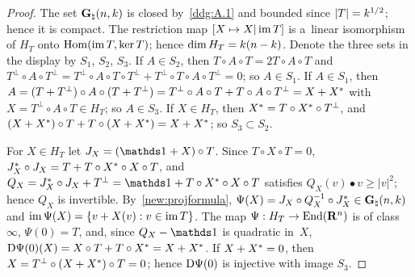\documentclass[a4paper,twoside,leqno]{article}
\newcommand{\Gk}{\pgrass{\adim}{\vdim}}        %
\begin{document}
\begin{proof}
    The set $\Gk$ is closed by~\ref{ddg:A.1} and bounded since $|T| = k^{1/2}$; hence it is
    compact. The restriction map $[ X \mapsto X | \operatorname{im} T ]$ is a~linear isomorphism of $H_T$ onto
    $\operatorname{Hom}(\operatorname{im} T, \ker T)$; hence $\dim H_T = k(n - k)$. Denote the three sets in the
    display by $S_1$, $S_2$, $S_3$. If $A \in S_2$, then $T \circ A \circ T = 2 T \circ A \circ
    T$ and $T^\perp \circ A \circ T^\perp = T^\perp \circ A \circ T \circ T^\perp + T^\perp \circ
    T \circ A \circ T^\perp = 0$; so $A \in S_1$. If $A \in S_1$, then $A = (T + T^\perp) \circ A
    \circ (T + T^\perp) = T^\perp \circ A \circ T + T \circ A \circ T^\perp = X + X^{*}$
    with $X = T^\perp \circ A \circ T \in H_T$; so $A \in S_3$. If $X \in H_T$, then $X^{*}
    = T \circ X^{*} \circ T^\perp$, and $(X + X^{*}) \circ T + T \circ (X +
    X^{*}) = X + X^{*}$; so $S_3 \subset S_2$.

    For $X \in H_T$ let $J_X = (\id{} + X) \circ T$. Since $T \circ X \circ T = 0$,
    $J_X^{*} \circ J_X = T + T \circ X^{*} \circ X \circ T$, and $Q_X =
    \transpose{J_X} \circ J_X + T^\perp = \id{} + T \circ \transpose{X} \circ X \circ T$ satisfies
    $Q_X(v) \bullet v \ge |v|^2$; hence $Q_X$ is invertible. By~\ref{new:projformula}, $\Psi(X) =
    J_X \circ Q_X^{-1} \circ \transpose{J_X} \in \Gk$ and $\operatorname{im} \Psi(X) = \{ v + X(v) : v \in \operatorname{im} T
    \}$. The map $\Psi : H_T \to \mathrm{End}({\mathbf{R}^{n}})$ is of class~$\infty$, $\Psi(0) = T$, and, since
    $Q_X - \id{}$ is quadratic in~$X$, $\mathrm{D} \Psi(0)(X) = X \circ T + T \circ X^{*} = X +
    X^{*}$. If $X + X^{*} = 0$, then $X = T^\perp \circ (X + X^{*})
    \circ T = 0$; hence $\mathrm{D} \Psi(0)$ is injective with image $S_3$.


\end{proof}
\end{document}
